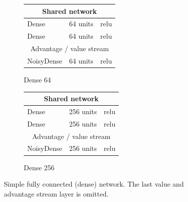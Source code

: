 \begin{figure}
  \centering
  \begin{subfigure}[b]{0.48\linewidth}
    \centering
	\begin{tabular}{l l l}
		\multicolumn{3}{c}{Shared network} \\
		\midrule
		Dense & 64 units & relu \\
		Dense & 64 units & relu \\
		\toprule
		\multicolumn{3}{c}{Advantage / value stream} \\
		\midrule
		NoisyDense & 64 units & relu \\
		\toprule
	\end{tabular}
    \caption{Dense 64}
  \end{subfigure}
  \begin{subfigure}[b]{0.48\linewidth}
    \centering
	\begin{tabular}{l l l}
		\multicolumn{3}{c}{Shared network} \\
		\midrule
		Dense & 256 units & relu \\
		Dense & 256 units & relu \\
		\toprule
		\multicolumn{3}{c}{Advantage / value stream} \\
		\midrule
		NoisyDense & 256 units & relu \\
		\toprule
	\end{tabular}
    \caption{Dense 256}
  \end{subfigure}
  \caption{Simple fully connected (dense) network. The last value and advantage stream layer is omitted.}
  \label{fig:dense-arch}
\end{figure}


